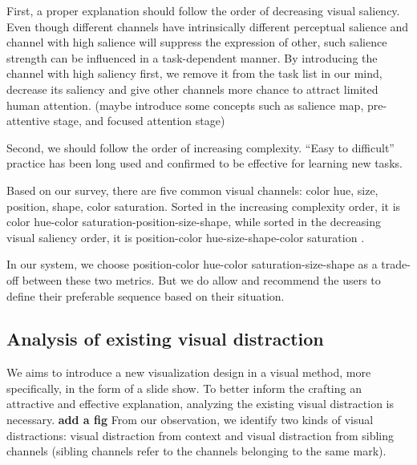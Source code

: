First, a proper explanation should follow the order of decreasing visual saliency.\cite{cleveland_graphical_1984} Even though different channels have intrinsically different perceptual salience and channel with high salience will suppress the expression of other, such salience strength can be influenced in a task-dependent manner. \cite{nothdurft_salience_2000} By introducing the channel with high saliency first, we remove it from the task list in our mind, decrease its saliency and give other channels more chance to attract limited human attention. (maybe introduce some concepts such as salience map, pre-attentive stage, and focused attention stage) \par
 Second, we should follow the order of increasing complexity. “Easy to difficult” practice has been long used and confirmed to be effective for learning new tasks\cite{bliss_effects_1992}.\par
 Based on our survey, there are five common visual channels: color hue, size, position, shape, color saturation. Sorted in the increasing complexity order, it is color hue-color saturation-position-size-shape, while sorted in the decreasing visual saliency order, it is position-color hue-size-shape-color saturation \cite{munzner_visualization_2014,cleveland_graphical_1984}.  \par
In our system, we choose position-color hue-color saturation-size-shape as a trade-off between these two metrics. But we do allow and recommend the users to define their preferable sequence based on their situation. 

\subsection{Analysis of existing visual distraction}
We aims to introduce a new visualization design in a visual method, more specifically, in the form of a slide show. To better inform the crafting an attractive and effective explanation, analyzing the existing visual distraction is necessary. 
\textbf{add a fig}
From our observation, we identify two kinds of visual distractions: visual distraction from context and visual distraction from sibling channels (sibling channels refer to the channels belonging to the same mark). \par
